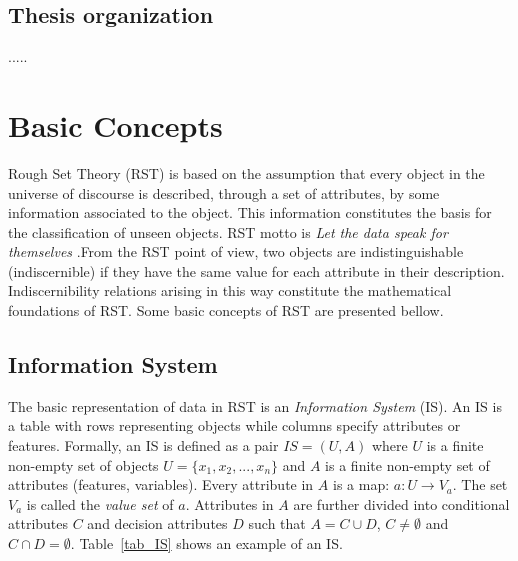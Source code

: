 \documentclass[letterpaper, twoside, openright, 12pt]{book}%
\begin{document}
\section{Thesis organization}
.....

\newpage 
\chapter{Basic Concepts} \label{chap:basicConcepts} 
	 Rough Set Theory (RST) is based on the assumption that every object in the universe of discourse is described, through a set of attributes, by some information associated to the object. This information constitutes the basis for the classification of unseen objects. RST motto is \textit{Let the data speak for themselves} \citep{Tiwari14}.From the RST point of view, two objects are indistinguishable (indiscernible) if they have the same value for each attribute in their description. Indiscernibility relations arising in this way constitute the mathematical foundations of RST. Some basic concepts of RST are presented bellow.
	  
	\section{Information System}
	  The basic representation of data in RST is an \emph{Information System} (IS). An IS is a table with rows
	  representing objects while columns specify attributes or features. Formally, an IS is defined as a pair
	  $IS=(U,A)$ where $U$ is a finite non-empty set of objects $U=\lbrace x_1,x_2,...,x_n\rbrace$ and $A$ is a 
	  finite non-empty set
	  of attributes (features, variables). Every attribute in $A$ is a map: $a: U \rightarrow V_a$. The set $V_a$ is
	  called the \textit{value set} of $a$. Attributes in $A$ are further divided into conditional attributes $C$ and 
	  decision attributes $D$ such that $A=C \cup D$, $C \neq \emptyset$ and $C \cap D =\emptyset$. 
	  Table~\ref{tab_IS} shows an example of an IS.
	  
\end{document}
